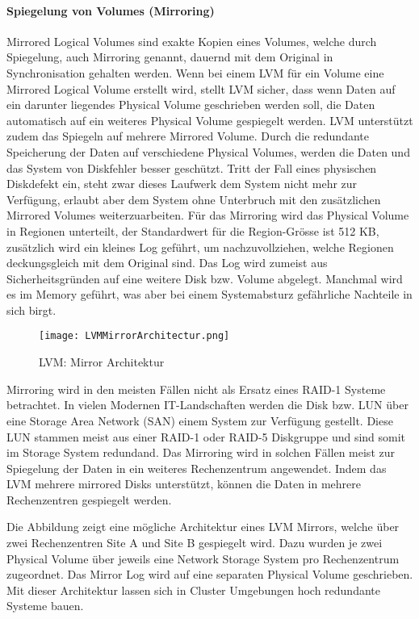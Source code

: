 \paragraph{Spiegelung von Volumes (Mirroring)} $\;$\\
Mirrored Logical Volumes sind exakte Kopien eines Volumes, welche durch Spiegelung, auch Mirroring genannt, dauernd mit dem Original in Synchronisation gehalten werden.
Wenn bei einem LVM für ein Volume eine Mirrored Logical Volume erstellt wird, stellt LVM sicher, dass wenn Daten auf ein darunter liegendes Physical Volume geschrieben werden soll, die Daten automatisch auf ein weiteres Physical Volume gespiegelt werden. LVM unterstützt zudem das Spiegeln auf mehrere Mirrored Volume. Durch die redundante Speicherung der Daten auf verschiedene Physical Volumes, werden die Daten und das System von Diskfehler besser geschützt. Tritt der Fall eines physischen Diskdefekt ein, steht zwar dieses Laufwerk dem System nicht mehr zur Verfügung, erlaubt aber dem System ohne Unterbruch mit den zusätzlichen Mirrored Volumes weiterzuarbeiten.
Für das Mirroring wird das Physical Volume in Regionen unterteilt, der Standardwert für die Region-Grösse ist 512 KB, zusätzlich wird ein kleines Log geführt, um nachzuvollziehen, welche Regionen deckungsgleich mit dem Original sind. Das Log wird zumeist aus Sicherheitsgründen auf eine weitere Disk bzw. Volume abgelegt. Manchmal wird es im Memory geführt, was aber bei einem Systemabsturz gefährliche Nachteile in sich birgt.

\begin{figure}[H]
\centering
\texttt{[image: LVMMirrorArchitectur.png]}
\caption{LVM: Mirror Architektur}
\label{fig:LVM Mirror Architektur}
\end{figure}

Mirroring wird in den meisten Fällen nicht als Ersatz eines RAID-1 Systeme betrachtet. In vielen Modernen IT-Landschaften werden die Disk bzw. \gls{LUN} über eine Storage Area Network (\gls{SAN}) einem System zur Verfügung gestellt. Diese \gls{LUN} stammen meist aus einer RAID-1 oder RAID-5 Diskgruppe und sind somit im Storage System redundand. Das Mirroring wird in solchen Fällen meist zur Spiegelung der Daten in ein weiteres Rechenzentrum angewendet. Indem das LVM mehrere mirrored Disks unterstützt, können die Daten in mehrere Rechenzentren gespiegelt werden. 


Die Abbildung  zeigt eine mögliche Architektur eines LVM Mirrors, welche über zwei Rechenzentren Site A und Site B gespiegelt wird. Dazu wurden je zwei Physical Volume über jeweils eine Network Storage System pro Rechenzentrum zugeordnet. Das Mirror Log wird auf eine separaten Physical Volume geschrieben. Mit dieser Architektur lassen sich in Cluster Umgebungen hoch redundante Systeme bauen.


